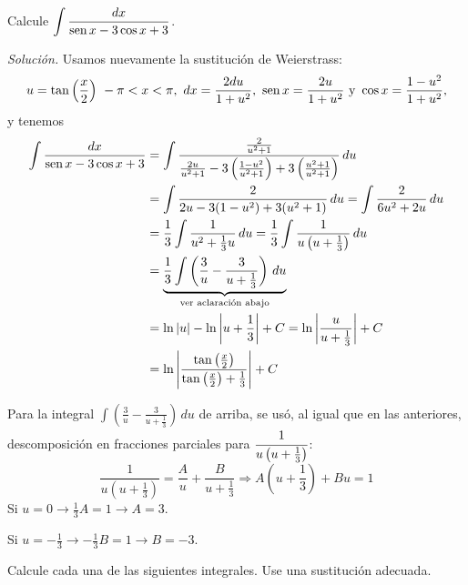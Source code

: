 \begin{ejemplo}
Calcule $\displaystyle\int \frac{dx}{\text{\rm sen}\, x-3\cos x+3}$.

\end{ejemplo}
\textit{Solución.} Usamos nuevamente la sustitución de Weierstrass:
{\small
\[
u=\tan \left( \frac{x}{2}\right)\ -\pi<x<\pi,\ dx=\frac{2du}{1+u^{2}},\ \sen x=\frac{2u}{1+u^{2}}\text{ y }\cos x=\frac{1-u^{2}}{1+u^{2}},
\]
}
y tenemos
{\small
\begin{align*}
	\int \frac{dx}{\text{\rm sen}\, x - 3\cos x + 3}
	&= \int \frac{\frac{2}{u^{2}+1}}{\frac{2u}{u^{2}+1}
		- 3\left( \frac{1 - u^{2}}{u^{2}+1} \right)
		+ 3\left( \frac{u^{2}+1}{u^{2}+1} \right)} \, du \\
	&= \int \frac{2}{2u - 3(1 - u^{2}) + 3(u^{2} + 1)} \, du
	= \int \frac{2}{6u^{2} + 2u} \, du \\
	&= \frac{1}{3} \int \frac{1}{u^{2} + \frac{1}{3}u} \, du
	= \frac{1}{3} \int \frac{1}{u\left( u + \frac{1}{3} \right)} \, du \\
	&= \underbrace{\frac{1}{3} \int \left( \frac{3}{u}
		- \frac{3}{u + \frac{1}{3}} \right) \, du}_{\text{ver aclaración abajo}} \\
	&= \ln\left| u \right| - \ln\left| u + \frac{1}{3} \right| + C
	= \ln\left| \frac{u}{u + \frac{1}{3}} \right| + C \\
	&= \ln\left| \frac{\tan\left( \frac{x}{2} \right)}{\tan\left( \frac{x}{2} \right) + \frac{1}{3}} \right| + C
\end{align*}
}

Para la integral $\displaystyle\int \left( \frac{3}{u}-\frac{3}{u+\frac{1}{3}}\right)\, du$ de arriba, se usó, al igual que en las anteriores, descomposición en fracciones parciales para $\cfrac{1}{u\left( u+\frac{1}{3}\right)}$:
\[
\frac{1}{u\left( u+\frac{1}{3}\right)}=\frac{A}{u}+\frac{B}{u+\frac{1}{3}}\Rightarrow A\left( u+\frac{1}{3}\right) +Bu=1
\]
Si $u=0\rightarrow \frac{1}{3}A=1\rightarrow A=3$.

Si $u=-\frac{1}{3}\rightarrow -\frac{1}{3}B=1\rightarrow B=-3.$



\textnormal{Calcule cada una de las siguientes integrales. Use una sustitución adecuada.}\\

